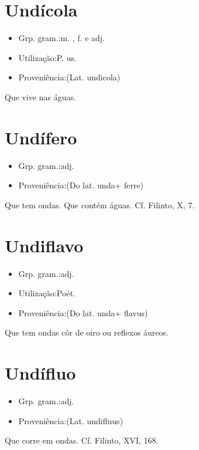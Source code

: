 \documentclass{article}
\begin{document}
\section{Undícola}
\begin{itemize}
\item {Grp. gram.:m. ,  f.  e  adj.}
\end{itemize}
\begin{itemize}
\item {Utilização:P. us.}
\end{itemize}
\begin{itemize}
\item {Proveniência:(Lat. \textunderscore undicola\textunderscore )}
\end{itemize}
Que vive nas águas.
\section{Undífero}
\begin{itemize}
\item {Grp. gram.:adj.}
\end{itemize}
\begin{itemize}
\item {Proveniência:(Do lat. \textunderscore unda\textunderscore  + \textunderscore ferre\textunderscore )}
\end{itemize}
Que tem ondas.
Que contém águas. Cf. Filinto, X, 7.
\section{Undiflavo}
\begin{itemize}
\item {Grp. gram.:adj.}
\end{itemize}
\begin{itemize}
\item {Utilização:Poét.}
\end{itemize}
\begin{itemize}
\item {Proveniência:(Do lat. \textunderscore unda\textunderscore  + \textunderscore flavus\textunderscore )}
\end{itemize}
Que tem ondas côr de oiro ou reflexos áureos.
\section{Undífluo}
\begin{itemize}
\item {Grp. gram.:adj.}
\end{itemize}
\begin{itemize}
\item {Proveniência:(Lat. \textunderscore undifluus\textunderscore )}
\end{itemize}
Que corre em ondas. Cf. Filinto, XVI, 168.
\end{document}
